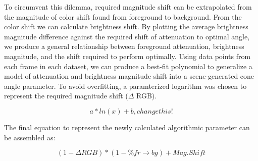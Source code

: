 \documentclass[12pt]{report}
\begin{document}
To circumvent this dilemma, required magnitude shift can be extrapolated from the magnitude of color shift found from foreground to background. From the color shift we can calculate brightness shift. By plotting the average brightness magnitude difference against the required shift of attenuation to optimal angle, we produce a general relationship between foreground attenuation, brightness magnitude, and the shift required to perform optimally. Using data points from each frame in each dataset, we can produce a best-fit polynomial to generalize a model of attenuation and brightness magnitude shift into a scene-generated cone angle parameter. To avoid overfitting, a paramterized logarithm was chosen to represent the required magnitude shift ($\Delta$ RGB).

\begin{equation}
a*ln(x) + b, {change this!}
\end{equation}

The final equation to represent the newly calculated algorithmic parameter can be assembled as:

\begin{equation}
(1 - \Delta RGB)*(1 - \%fr \rightarrow bg) + Mag. Shift
\end{equation}
\end{document}
